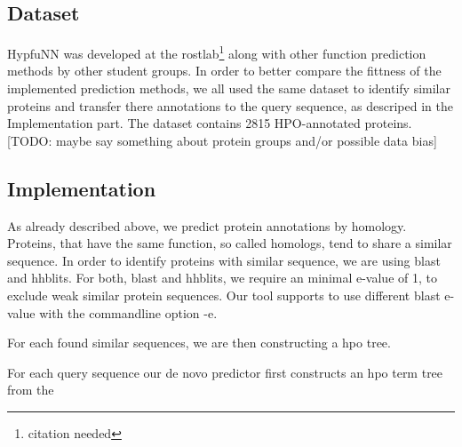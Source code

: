 \subsection{Dataset}

HypfuNN was developed at the rostlab\footnote{citation needed} along with other function prediction methods by other student groups. In order to better compare the fittness of the implemented prediction
methods, we all used the same dataset to identify similar proteins and transfer there annotations to the query sequence, as descriped in the Implementation part. The dataset contains 2815 HPO-annotated
proteins. [TODO: maybe say something about protein groups and/or possible data bias]

\subsection{Implementation}

As already described above, we predict protein annotations by homology. Proteins, that have the same function, so called homologs, tend to share a similar sequence. In order to identify proteins
with similar sequence, we are using blast and hhblits. For both, blast and hhblits, we require an minimal e-value of 1, to exclude weak similar protein sequences. Our tool supports to use
different blast e-value with the commandline option -e.

For each found similar sequences, we are then constructing a hpo tree.




For each query sequence our de novo predictor first constructs an hpo term tree from the 
